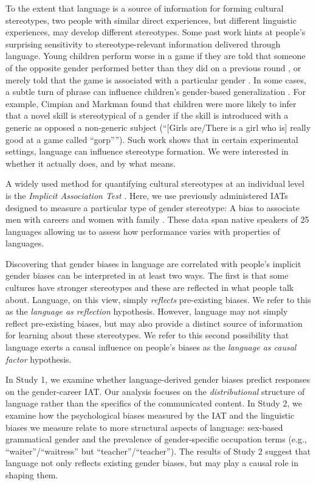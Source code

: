 \documentclass[9pt,twocolumn,twoside]{pnas-new}
\begin{document}
To the extent that language is a source of information for forming
cultural stereotypes, two people with similar direct experiences, but
different linguistic experiences, may develop different stereotypes.
Some past work hints at people's surprising sensitivity to
stereotype-relevant information delivered through language. Young
children perform worse in a game if they are told that someone of the
opposite gender performed better than they did on a previous round
\cite{rhodes2008preschoolers}, or merely told that the game is associated
with a particular gender \cite{cimpian2012good}. In some
cases, a subtle turn of phrase can influence children's gender-based
generalization \cite{cimpian2011generic,rhodes2018subtle}. For example, Cimpian and Markman found that children
were more likely to infer that a novel skill is stereotypical of a
gender if the skill is introduced with a generic as opposed a
non-generic subject (``{[}Girls are/There is a girl who is{]} really
good at a game called ``gorp''''). Such work shows that in certain
experimental settings, language can influence stereotype formation. We
were interested in whether it actually does, and by what means.

A widely used method for quantifying cultural stereotypes at an
individual level is the \emph{Implicit Association Test} \cite[IAT]{greenwald1998measuring}. Here, we use previously
administered IATs designed to measure a particular type of gender
stereotype: A bias to associate men with careers and women with family
\cite[\emph{N} = 657,335]{nosek2002harvesting}. These data span native
speakers of 25 languages allowing us to assess how performance varies
with properties of languages. 

Discovering that gender biases in language are correlated with people’s implicit gender biases can be interpreted in at least two ways.  The first is that some cultures have stronger stereotypes and these are reflected in what people talk
about. Language, on this view, simply \emph{reflects} pre-existing
biases. We refer to this as the \emph{language as reflection}
hypothesis. However, language may not simply reflect pre-existing
biases, but may also provide a distinct source of information for
learning about these stereotypes. We refer to this second possibility
that language exerts a causal influence on people's biases as the
\emph{language as causal factor} hypothesis.

In Study 1, we examine whether language-derived gender biases predict
responses on the gender-career IAT. Our analysis focuses on the
\emph{distributional} structure of language rather than the specifics of
the communicated content. In Study 2, we examine how the psychological
biases measured by the IAT and the linguistic biases we measure relate
to more structural aspects of language: sex-based grammatical gender and
the prevalence of gender-specific occupation terms (e.g.,
\enquote{waiter}/\enquote{waitress} but
\enquote{teacher}/\enquote{teacher}). The results of Study 2 suggest
that language not only reflects existing gender biases, but may play a
causal role in shaping them.
\end{document}
